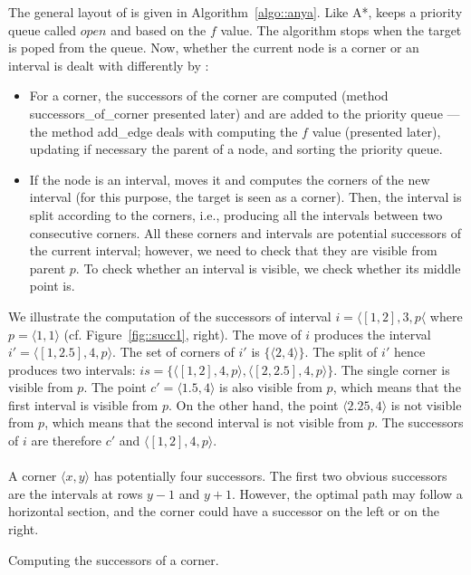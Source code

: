 The general layout of \anya{} is given in Algorithm~\ref{algo::anya}.  
Like A*, \anya{} keeps a priority queue called $open$ 
and based on the $f$ value.  
The algorithm stops when the target is poped from the queue.  
Now, whether the current node is a corner or an interval 
is dealt with differently by \anya: 
\begin{itemize}
\item 
  For a corner, the successors of the corner are computed 
  (method successors\_of\_corner presented later) 
  and are added to the priority queue --- 
  the method add\_edge deals with computing the $f$ value 
  (presented later), updating if necessary the parent of a node, 
  and sorting the priority queue.  
\item 
  If the node is an interval, \anya{} moves it 
  and computes the corners of the new interval 
  (for this purpose, the target is seen as a corner).  
  Then, the interval is split according to the corners, 
  i.e., producing all the intervals between two consecutive corners.  
  All these corners and intervals 
  are potential successors of the current interval; 
  however, we need to check that they are visible from parent $p$.  
  To check whether an interval is visible, 
  we check whether its middle point is.  
\end{itemize}

We illustrate the computation of the successors 
of interval $i = \langle [1,2],3,p\langle$ 
where $p = \langle1,1\rangle$ 
(cf. Figure~\ref{fig::succ1}, right).  
The move of $i$ produces 
the interval $i' = \langle [1,2.5],4,p\rangle$.  
The set of corners of $i'$ is $\{\langle 2,4\rangle\}$.  
The split of $i'$ hence produces two intervals: 
$is = \{
\langle [1,2],4,p\rangle,  
\langle [2,2.5],4,p\rangle
\}$.  
The single corner is visible from $p$.  
The point $c' = \langle 1.5,4\rangle$ is also visible from $p$, 
which means that the first interval is visible from $p$.  
On the other hand, the point $\langle 2.25,4\rangle$ 
is not visible from $p$, 
which means that the second interval is not visible from $p$.  
The successors of $i$ are therefore $c'$ 
and $\langle [1,2],4,p\rangle$.  

\paragraph*{}

A corner $\langle x,y\rangle$ has potentially four successors.  
The first two obvious successors 
are the intervals at rows $y-1$ and $y+1$.  
However, the optimal path may follow a horizontal section, 
and the corner could have a successor on the left or on the right.  

\begin{algorithm}
  
  \caption{Computing the successors of a corner.}
  \label{algo::successorsofacorner}
\end{algorithm}



\begin{figure}[tb]
  \begin{center}
  \end{center}
\end{figure}
